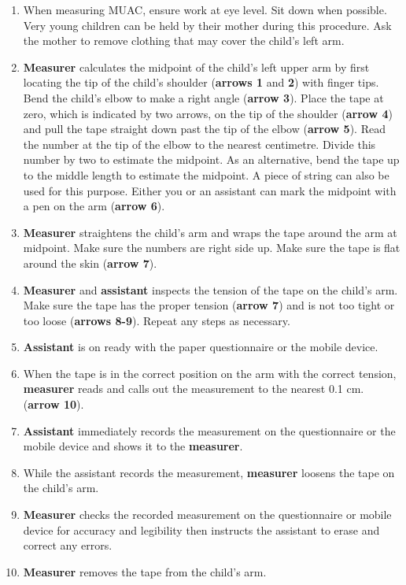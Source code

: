 \documentclass[
  12pt,
]{book}
\begin{document}
\begin{enumerate}
\def\labelenumi{\arabic{enumi}.}
\item
  When measuring MUAC, ensure work at eye level. Sit down when possible. Very young children can be held by their mother during this procedure. Ask the mother to remove clothing that may cover the child's left arm.
\item
  \textbf{Measurer} calculates the midpoint of the child's left upper arm by first locating the tip of the child's shoulder (\textbf{arrows 1} and \textbf{2}) with finger tips. Bend the child's elbow to make a right angle (\textbf{arrow 3}). Place the tape at zero, which is indicated by two arrows, on the tip of the shoulder (\textbf{arrow 4}) and pull the tape straight down past the tip of the elbow (\textbf{arrow 5}). Read the number at the tip of the elbow to the nearest centimetre. Divide this number by two to estimate the midpoint. As an alternative, bend the tape up to the middle length to estimate the midpoint. A piece of string can also be used for this purpose. Either you or an assistant can mark the midpoint with a pen on the arm (\textbf{arrow 6}).
\item
  \textbf{Measurer} straightens the child's arm and wraps the tape around the arm at midpoint. Make sure the numbers are right side up. Make sure the tape is flat around the skin (\textbf{arrow 7}).
\item
  \textbf{Measurer} and \textbf{assistant} inspects the tension of the tape on the child's arm. Make sure the tape has the proper tension (\textbf{arrow 7}) and is not too tight or too loose (\textbf{arrows 8-9}). Repeat any steps as necessary.
\item
  \textbf{Assistant} is on ready with the paper questionnaire or the mobile device.
\item
  When the tape is in the correct position on the arm with the correct tension, \textbf{measurer} reads and calls out the measurement to the nearest 0.1 cm. (\textbf{arrow 10}).
\item
  \textbf{Assistant} immediately records the measurement on the questionnaire or the mobile device and shows it to the \textbf{measurer}.
\item
  While the assistant records the measurement, \textbf{measurer} loosens the tape on the child's arm.
\item
  \textbf{Measurer} checks the recorded measurement on the questionnaire or mobile device for accuracy and legibility then instructs the assistant to erase and correct any errors.
\item
  \textbf{Measurer} removes the tape from the child's arm.
\end{enumerate}
\end{document}
